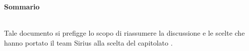 \noindent\begin{Large}\textbf{Sommario}\end{Large}\\
\noindent Tale documento si prefigge lo scopo di riassumere la discussione e le scelte che hanno portato il team Sirius alla scelta del capitolato \progetto.\\

